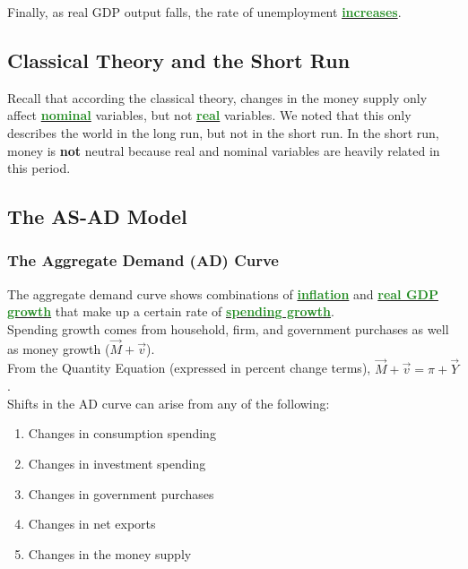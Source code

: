 \documentclass[11pt]{article}\usepackage[]{graphicx}\usepackage[]{color}
\theoremstyle{definition}
\newcommand{\dd}[1]{{\underline{\textbf{\textcolor{ForestGreen}{#1}}}}}
\begin{document}
Finally, as real GDP output falls, the rate of unemployment \dd{increases}. 

\subsection{Classical Theory and the Short Run}

Recall that according the classical theory, changes in the money supply only affect \dd{nominal} variables, but not \dd{real} variables. We noted that this only describes the world in the long run, but not in the short run. In the short run, money is \textbf{not} neutral because real and nominal variables are heavily related in this period. 

\subsection{The AS-AD Model}

\subsubsection*{The Aggregate Demand (AD) Curve}

The aggregate demand curve shows combinations of \dd{inflation} and \dd{real GDP growth} that make up a certain rate of \dd{spending growth}. 
\\

Spending growth comes from household, firm, and government purchases as well as money growth ($\vec{M} + \vec{v}$). 
\\

From the Quantity Equation (expressed in percent change terms),  $\vec{M} + \vec{v} = \pi + \vec{Y}$. 
\\

Shifts in the AD curve can arise from any of the following:
\begin{enumerate}
	\item Changes in consumption spending
	\item Changes in investment spending
	\item Changes in government purchases
	\item Changes in net exports
	\item Changes in the money supply
\end{enumerate}
\end{document}
